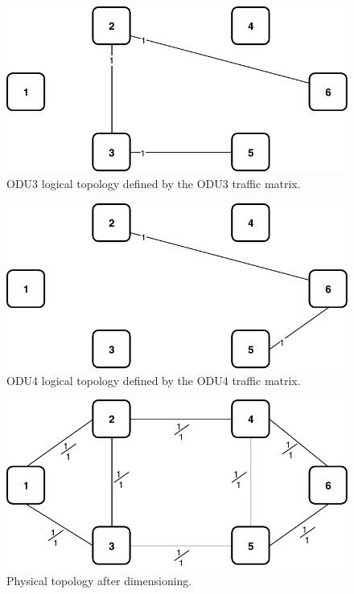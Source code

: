 \begin{figure}[h!]
\centering
\includegraphics[width=12cm]{sdf/ilp/transparent_protection/figures/logical_topology_ODU3_low}
\caption{ODU3 logical topology defined by the ODU3 traffic matrix.}
\label{logical2_ODU3_protectionlow}
\end{figure}

\begin{figure}[h!]
\centering
\includegraphics[width=12cm]{sdf/ilp/transparent_protection/figures/logical_topology_ODU4_low}
\caption{ODU4 logical topology defined by the ODU4 traffic matrix.}
\label{logical2_ODU4_protectionlow}
\end{figure}
\newpage
\begin{figure}[h!]
\centering
\includegraphics[width=13cm]{sdf/ilp/transparent_protection/figures/physical_topology}
\caption{Physical topology after dimensioning.}
\label{physical2_protectionlow}
\end{figure}

